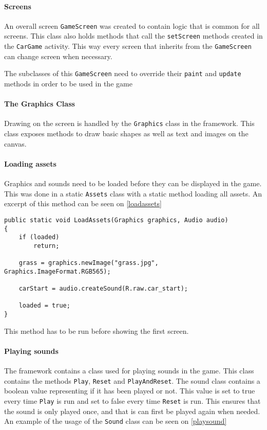 \paragraph{Screens}
An overall screen \lstinline|GameScreen| was created to contain logic that is common for all screens.
This class also holds methods that call the \lstinline|setScreen| methods created in the \lstinline|CarGame| activity.
This way every screen that inherits from the \lstinline|GameScreen| can change screen when necessary.

The subclasses of this \lstinline|GameScreen| need to override their \lstinline|paint| and \lstinline|update| methods in order to be used in the game

\paragraph{The Graphics Class}
Drawing on the screen is handled by the \lstinline|Graphics| class in the framework.
This class exposes methods to draw basic shapes as well as text and images on the canvas. 

\paragraph{Loading assets}
Graphics and sounds need to be loaded before they can be displayed in the game. 
This was done in a static \lstinline|Assets| class with a static method loading all assets.
An excerpt of this method can be seen on \cref{loadassets}

\begin{lstlisting}[caption=The LoadAssets method, label=loadassets]
public static void LoadAssets(Graphics graphics, Audio audio) 
{
	if (loaded)
		return;

	grass = graphics.newImage("grass.jpg", Graphics.ImageFormat.RGB565);
	
	carStart = audio.createSound(R.raw.car_start);
	
	loaded = true;
}
\end{lstlisting}

This method has to be run before showing the first screen.

\paragraph{Playing sounds}
The framework contains a class used for playing sounds in the game. 
This class contains the methods \lstinline|Play|, \lstinline|Reset| and \lstinline|PlayAndReset|.
The sound class contains a boolean value representing if it has been played or not. 
This value is set to true every time \lstinline|Play| is run and set to false every time \lstinline|Reset| is run.
This ensures that the sound is only played once, and that is can first be played again when needed.
An example of the usage of the \lstinline|Sound| class can be seen on \cref{playsound}

